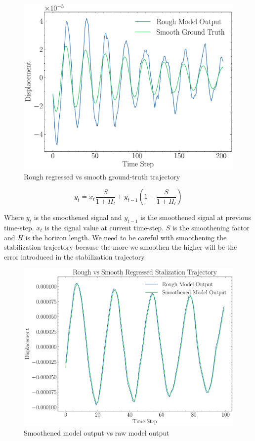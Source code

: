 \begin{figure}[H]
    \centering
    \includegraphics[scale=0.41]{images/fig_chapter4/nn_related/rough_mo_smooth_gt.pdf}
    \caption{Rough regressed vs smooth ground-truth trajectory}
    \label{fig:rough_mo_smooth_gt}
\end{figure}

\begin{equation}[H]
    y_t = x_t  \frac{S}{1+H_l} + y_{t-1}(1 - \frac{S}{1+H_l})
    \label{eqn:emaf}
\end{equation}

Where $ y_t $ is the smoothened signal and $ y_{t-1} $ is the smoothened signal at previous time-step. $ x_t $ is the signal value at current time-step. $ S $ is the smoothening factor and $ H $ is the horizon length. We need to be careful with smoothening the stabilization trajectory because the more we smoothen the higher will be the error introduced in the stabilization trajectory.


\begin{figure}[H]
    \centering
    \includegraphics[scale=0.41]{images/fig_chapter4/nn_related/rough_mo_smooth_mo.pdf}
    \caption{Smoothened model output vs raw model output}
    \label{fig:rough_mo_smooth_mo}
\end{figure}

